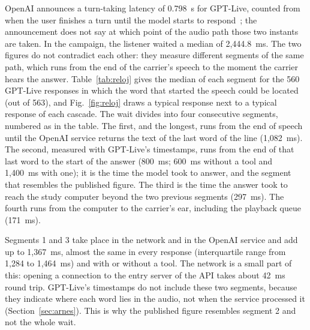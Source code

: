 \documentclass[11pt]{article}
\newcommand{\RNC}{563}
\newcommand{\RObsMedC}{2{,}444.8}
\newcommand{\RRedMed}{42}
\newcommand{\RRelojEntregaMed}{171}
\newcommand{\RRelojModeloConHerrMed}{1{,}400}
\newcommand{\RRelojModeloMed}{800}
\newcommand{\RRelojModeloSinHerrMed}{600}
\newcommand{\RRelojN}{560}
\newcommand{\RRelojSalidaMed}{297}
\newcommand{\RRelojServicioMed}{1{,}367}
\newcommand{\RRelojServicioQa}{1{,}284}
\newcommand{\RRelojServicioQb}{1{,}464}
\newcommand{\RRelojUltimaMed}{1{,}082}
\begin{document}
OpenAI announces a turn-taking latency of 0.798~s for GPT-Live, counted from when the
user finishes a turn until the model starts to respond~\cite{gptlive}; the announcement
does not say at which point of the audio path those two instants are taken. In the
campaign, the listener waited a median of \RObsMedC~ms. The two figures do not contradict each other: they measure
different segments of the same path, which runs from the end of the carrier's speech
to the moment the carrier hears the answer. Table~\ref{tab:reloj} gives the median of
each segment for the \RRelojN{} GPT-Live responses in which the word that started the
speech could be located (out of \RNC), and Fig.~\ref{fig:reloj} draws a typical
response next to a typical response of each cascade.
The wait divides into four consecutive segments, numbered as in the table.
The first, and the longest, runs from the end of speech until the OpenAI service returns the text of the last word of the line (\RRelojUltimaMed~ms).
The second, measured with GPT-Live's timestamps, runs from the end of that last word to the start of the answer (\RRelojModeloMed~ms; \RRelojModeloSinHerrMed~ms without a tool and \RRelojModeloConHerrMed~ms with one); it is the time the model took to answer, and the segment that resembles the published figure.
The third is the time the answer took to reach the study computer beyond the two previous segments (\RRelojSalidaMed~ms).
The fourth runs from the computer to the carrier's ear, including the playback queue (\RRelojEntregaMed~ms).

Segments 1 and 3 take place in the network and in the OpenAI service and add up to
\RRelojServicioMed~ms, almost the same in every response (interquartile range from
\RRelojServicioQa{} to \RRelojServicioQb~ms) and with or without a tool. The network
is a small part of this: opening a connection to the entry server of the API takes
about \RRedMed~ms round trip. GPT-Live's timestamps do not
include these two segments, because they indicate where each word lies in the audio,
not when the service processed it (Section~\ref{sec:arnes}). This is why the published
figure resembles segment 2 and not the whole wait.
\end{document}
